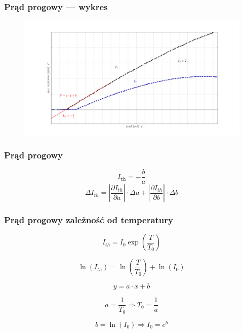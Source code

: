 \documentclass[xcolor={dvipsnames,table}]{beamer}
\begin{document}
\begin{frame}
\frametitle{Prąd progowy --- wykres}
\begin{figure}
\includegraphics[scale=0.20]{plot_theory.png}
\end{figure}
\end{frame}

\begin{frame}
\frametitle{Prąd progowy}
\center
\begin{equation*}
I_{\mathtt{th}} = -\frac{b}{a}
\end{equation*}
\begin{equation*}
\Delta I_{th} = \left\lvert \frac{\partial I_{th}}{\partial a} \right\rvert \cdot \Delta a + \left\lvert \frac{\partial I_{th}}{\partial b} \right\rvert \cdot \Delta b
\end{equation*}

\end{frame}

\begin{frame}
\frametitle{Prąd progowy zależność od temperatury}

\begin{equation*}
I_{th} = I_0 \exp \left( \frac{T}{T_0} \right)
\end{equation*}

\begin{equation*}
\ln (I_{th}) =  \ln \left( \frac{T}{T_0} \right) + \ln(I_{0})
\end{equation*}

\begin{equation*}
y = a \cdot x + b
\end{equation*}

\begin{equation*}
a = \frac{1}{T_0} \Rightarrow T_0 = \frac{1}{a}
\end{equation*}

\begin{equation*}
b = \ln(I_0) \Rightarrow I_0 = e^b
\end{equation*}
\end{frame}
\end{document}
